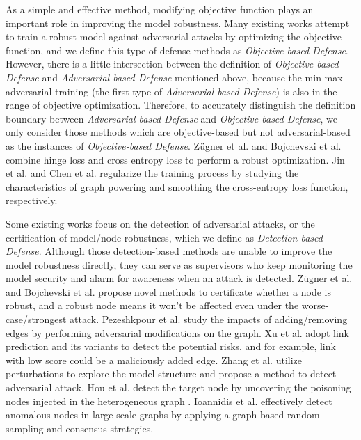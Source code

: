  As a simple and effective method, modifying objective function plays an important role in improving the model robustness. Many existing works attempt to train a robust model against adversarial attacks by optimizing the objective function, and we define this type of defense methods as \emph{Objective-based Defense}. However, there is a little intersection between the definition of \emph{Objective-based Defense} and \emph{Adversarial-based Defense} mentioned above, because the min-max adversarial training (the first type of \emph{Adversarial-based Defense}) is also in the range of objective optimization. Therefore, to accurately distinguish the definition boundary between \emph{Adversarial-based Defense} and \emph{Objective-based Defense}, we only consider those methods which are objective-based but not adversarial-based as the instances of \emph{Objective-based Defense}. Z\"ugner et al. \cite{zugner2019certifiable} and Bojchevski et al. \cite{bojchevski2019certifiable} combine hinge loss and cross entropy loss to perform a robust optimization. Jin et al. \cite{jin2019power} and Chen et al. \cite{chen2019can} regularize the training process by studying the characteristics of graph powering and smoothing the cross-entropy loss function, respectively.

 Some existing works focus on the detection of adversarial attacks, or the certification of model/node robustness, which we define as \emph{Detection-based Defense}. Although those detection-based methods are unable to improve the model robustness directly, they can serve as supervisors who keep monitoring the model security and alarm for awareness when an attack is detected. Z\"ugner et al. \cite{zugner2019certifiable} and Bojchevski et al. \cite{bojchevski2019certifiable} propose novel methods to certificate whether a node is robust, and a robust node means it won't be affected even under the worse-case/strongest attack. Pezeshkpour et al. \cite{pezeshkpour2019investigating} study the impacts of adding/removing edges by performing adversarial modifications on the graph. Xu et al. \cite{xu2018characterizing} adopt link prediction and its variants to detect the potential risks, and for example, link with low score could be a maliciously added edge. Zhang et al. \cite{zhang2019comparing} utilize perturbations to explore the model structure and propose a method to detect adversarial attack. Hou et al. \cite{hou2019alphacyber} detect the target node by uncovering the poisoning nodes injected in the heterogeneous graph \cite{sun2011pathsim}. Ioannidis et al. \cite{ioannidis2019graphsac} effectively detect anomalous nodes in large-scale graphs by applying a graph-based random sampling and consensus strategies.

